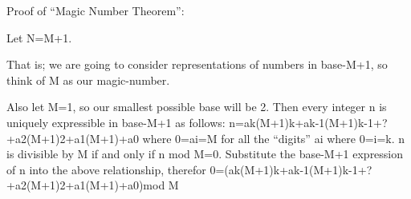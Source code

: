 \documentclass{article}
\begin{document}
Proof of ``Magic Number Theorem'':

Let N=M+1.

That is; we are going to consider representations of numbers in base-M+1, so think of M as our magic-number.

Also let M=1, so our smallest possible base will be 2.
Then every integer n is uniquely expressible in base-M+1 as follows:
n=ak(M+1)k+ak-1(M+1)k-1+?+a2(M+1)2+a1(M+1)+a0
where 0=ai=M for all the ``digits'' ai where 0=i=k.
n is divisible by M if and only if n mod M=0. 
Substitute the base-M+1 expression of n into the above relationship, therefor
0=(ak(M+1)k+ak-1(M+1)k-1+?+a2(M+1)2+a1(M+1)+a0)mod M


\end{document}
